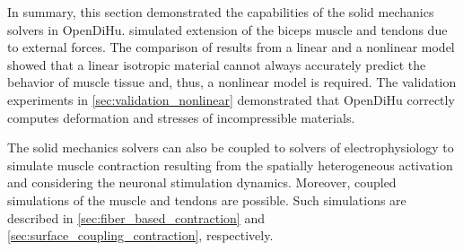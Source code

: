 In summary, this section demonstrated the capabilities of the solid mechanics solvers in OpenDiHu.  simulated extension of the biceps muscle and tendons due to external forces. The comparison of results from a linear and a nonlinear model showed that a linear isotropic material cannot always accurately predict the behavior of muscle tissue and, thus, a nonlinear model is required. The validation experiments in \cref{sec:validation_nonlinear} demonstrated that OpenDiHu correctly computes deformation and stresses of incompressible materials.

The solid mechanics solvers can also be coupled to solvers of electrophysiology to simulate muscle contraction resulting from the spatially heterogeneous activation and considering the neuronal stimulation dynamics. Moreover, coupled simulations of the muscle and tendons are possible. Such simulations are described in \cref{sec:fiber_based_contraction} and \cref{sec:surface_coupling_contraction}, respectively.

%


